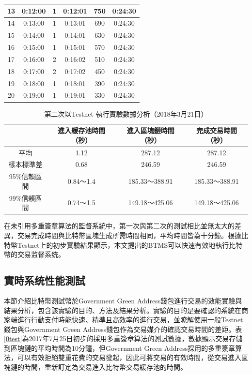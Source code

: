 \begin{enumerate}
\begin{table}[!htbp]
\begin{tabular}{|c|c|c|c|c|c|}
				13 & 0:12:00 & 1 & 0:12:01 & 750 & 0:24:30 \\ \hline
				14 & 0:13:00 & 1 & 0:13:01 & 690 & 0:24:30 \\ \hline
				15 & 0:14:00 & 1 & 0:14:01 & 630 & 0:24:30 \\ \hline
				16 & 0:15:00 & 1 & 0:15:01 & 570 & 0:24:30 \\ \hline
				17 & 0:16:00 & 2 & 0:16:02 & 510 & 0:24:30 \\ \hline
				18 & 0:17:00 & 2 & 0:17:02 & 450 & 0:24:30 \\ \hline
				19 & 0:18:00 & 1 & 0:18:01 & 390 & 0:24:30 \\ \hline
				20 & 0:19:00 & 1 & 0:19:01 & 330 & 0:24:30 \\ \hline
				\end{tabular}
				\end{table}

				\begin{table}[!htbp]
				\centering
				\caption{第二次以Testnet 執行實驗數據分析（2018年3月21日）}
				\label{2general-1}
				\begin{tabular}{|c|c|c|c|}
				\hline
				         & 進入緩存池時間（秒） & 進入區塊鏈時間（秒）    & 完成交易時間（秒）     \\ \hline
				平均       & 1.12       & 287.12        & 287.12        \\ \hline
				樣本標準差    & 0.68       & 246.59        & 246.59        \\ \hline
				95\%信賴區間 & 0.84～1.4   & 185.33～388.91 & 185.33～388.91 \\ \hline
				99\%信賴區間 & 0.74～1.5   & 149.18～425.06 & 149.18～425.06 \\ \hline
				\end{tabular}
				\end{table}


		\end{enumerate}

			在未引用多重簽章算法的監督系統中，第一次與第二次的測試相比並無太大的差異，交易完成時間與比特幣區塊生成所需時間相同，平均時間皆為十分鐘。根據比特幣Testnet上的初步實驗結果顯示，本文提出的BTMS可以快速有效地執行比特幣的交易监督系统。


		\subsection{實時系统性能測試}
		本節介紹比特幣測試幣於Government Green Address錢包進行交易的效能實驗與結果分析，包含該實驗的目的、方法及結果分析。實驗的目的是要確認的系統在商家端進行行動支付時能快速、精準且高效率的進行交易，並瞭解使用一般Testnet錢包與Government Green Address錢包作為交易媒介的確認交易時間的差距。表\ref{0test}為2017年7月25日初步的採用多重簽章算法的測試數據，數據顯示交易存儲到區塊鏈的平均時間為10分鐘，但Government Green Address採用的多重簽章算法，可以有效拒絕雙重花費的交易發起，因此可將交易的有效時間，從交易進入區塊鏈的時間，重新訂定為交易進入比特幣交易緩存池的時間。

